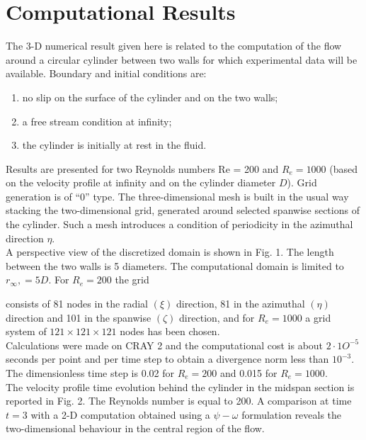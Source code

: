 \documentclass[11pt]{report}
\newcommand{\NI}{\noindent}
\begin{document}
	\section{Computational Results}
	The 3-D numerical result given here is related to the computation of the flow around a circular cylinder between two walls for which experimental data will be available. Boundary and initial conditions are: 
	\begin{enumerate}
		\item 	no slip on the surface of the cylinder and on the two walls; 
		\item  a free stream condition at infinity; 
		\item the cylinder is initially at rest in the fluid. 
	\end{enumerate}
	Results are presented for two Reynolds numbers Re = 200 and $R_e = 1000$ (based on the velocity profile at infinity and on the cylinder diameter $D$). Grid generation is of “0” type. The three-dimensional mesh is built in the
	usual way stacking the two-dimensional grid, generated around selected spanwise sections of the cylinder. Such a mesh introduces a condition of periodicity in the azimuthal direction $\eta$.\\
	
	\NI A perspective view of the discretized domain is shown in Fig. 1. The length between the two walls is 5 diameters. The computational domain is limited to $r_\infty, = 5D$. For $R_e = 200$ the grid 
	
	
	
	
	
	
	
	
	
	
	consists of 81 nodes in the radial $(\xi)$ direction, 81 in the azimuthal $(\eta)$ direction and 101 in the spanwise $(\zeta)$ direction, and for $R_e = 1000$ a grid system of $121 \times 121 \times 121$ nodes has been chosen.\\
	
	\NI Calculations were made on CRAY 2 and the computational cost is about $2 \cdot 1O^{-5}$ seconds per point and per time step to obtain a divergence norm less than $10^{-3}$. The dimensionless time step is 0.02 for $R_e = 200$ and 0.015 for $R_e = 1000$.\\
	The velocity profile time evolution behind the cylinder in the midspan section is reported in Fig. 2. The Reynolds number is equal to 200. A comparison at time $t = 3$ with a 2-D computation obtained using a $\psi - \omega$ formulation reveals the two-dimensional behaviour in the central region of the flow.
	
\end{document}
